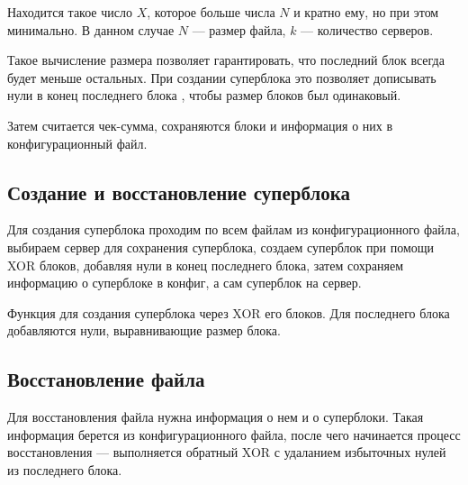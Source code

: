 Находится такое число $X$, которое больше числа $N$ и кратно ему, но при этом минимально. В данном случае $N$ ---  размер файла, $k$ --- количество серверов. 

Такое вычисление размера позволяет гарантировать, что последний блок всегда будет меньше остальных. При создании суперблока это позволяет дописывать нули в конец последнего блока , чтобы размер блоков был одинаковый. 

Затем считается чек-сумма, сохраняются блоки и информация о них в конфигурационный файл. 

\newpage
{}
\newpage

\newpage
\subsection{Создание и восстановление суперблока}
Для создания суперблока проходим по всем файлам из конфигурационного файла, выбираем сервер для сохранения суперблока, создаем суперблок при помощи XOR блоков, добавляя нули в конец последнего блока, затем сохраняем информацию о суперблоке в конфиг, а сам суперблок на сервер.   

\newpage
{}

Функция для создания суперблока через XOR его блоков. Для последнего блока добавляются нули, выравнивающие размер блока.

\newpage
{}
\newpage
\subsection{Восстановление файла}
Для восстановления файла нужна информация о нем и о суперблоки. Такая информация берется из конфигурационного файла, после чего начинается процесс восстановления --- выполняется обратный XOR с удаланием избыточных нулей из последнего блока.  

